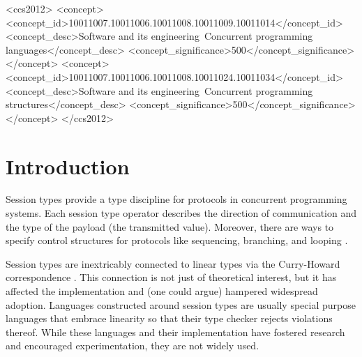 \documentclass[acmsmall,screen]{acmart}
\begin{document}
\begin{CCSXML}
<ccs2012>
   <concept>
       <concept_id>10011007.10011006.10011008.10011009.10011014</concept_id>
       <concept_desc>Software and its engineering~Concurrent programming languages</concept_desc>
       <concept_significance>500</concept_significance>
       </concept>
   <concept>
       <concept_id>10011007.10011006.10011008.10011024.10011034</concept_id>
       <concept_desc>Software and its engineering~Concurrent programming structures</concept_desc>
       <concept_significance>500</concept_significance>
       </concept>
 </ccs2012>
\end{CCSXML}



\maketitle

\section{Introduction}
\label{sec:introduction}





Session types provide a type discipline for protocols
in concurrent programming systems. Each session type operator
describes the direction of communication and the type of the
payload (the transmitted value). Moreover, there are ways to specify
control structures for protocols like sequencing, branching, and
looping \cite{DBLP:conf/concur/Honda93,DBLP:conf/parle/TakeuchiHK94,DBLP:conf/esop/HondaVK98}.

Session types are inextricably connected to linear types via the
Curry-Howard correspondence
\cite{DBLP:conf/concur/CairesP10,DBLP:journals/mscs/CairesPT16,DBLP:journals/jfp/Wadler14}. 
This connection is not just of theoretical interest, but it
has affected the implementation and (one could argue) hampered widespread
adoption. Languages constructed around session types are usually
special purpose languages that embrace linearity so that their type
checker rejects violations thereof.
While these languages and their implementation have fostered research
and encouraged experimentation, they are not widely used.
\end{document}

